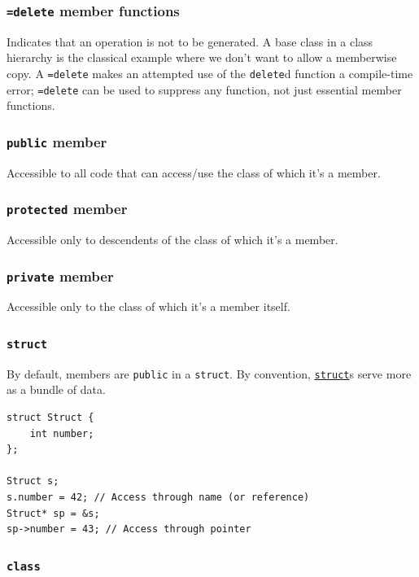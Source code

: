 \documentclass[table, xcdraw]{article}%
\begin{document}
\subsubsection{\texttt{=delete} member functions} \label{isdelete}

Indicates that an operation is not to be generated. A base class in a class hierarchy is the classical example where we don’t want to allow a memberwise copy. A \texttt{=delete} makes an attempted use of the \texttt{delete}d function a compile-time error; \texttt{=delete} can be used to suppress any function, not just essential member functions.

\subsubsection{\texttt{public} member}

Accessible to all code that can access/use the class of which it's a member.

\subsubsection{\texttt{protected} member}

Accessible only to descendents of the class of which it's a member.

\subsubsection{\texttt{private} member}

Accessible only to the class of which it's a member itself.

\subsubsection{\texttt{struct}} \label{struct}

By default, members are \texttt{public} in a \texttt{struct}. By convention, \hyperref[struct]{\texttt{struct}}s serve more as a bundle of data.

\begin{verbatim}
struct Struct {
    int number;
};

Struct s;
s.number = 42; // Access through name (or reference)
Struct* sp = &s;
sp->number = 43; // Access through pointer
\end{verbatim}

\subsubsection{\texttt{class}} \label{class}
\end{document}
